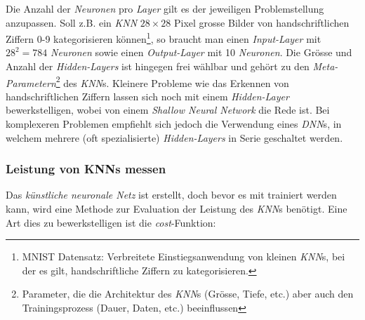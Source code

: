 
Die Anzahl der \textit{Neuronen} pro \textit{Layer} gilt es der jeweiligen Problemstellung anzupassen. Soll z.B. ein \textit{KNN} $28\times 28$ Pixel grosse Bilder von handschriftlichen Ziffern 0-9 kategorisieren können\footnote{MNIST Datensatz\cite{mnist}: Verbreitete Einstiegsanwendung von kleinen \textit{KNN}s, bei der es gilt, handschriftliche Ziffern zu kategorisieren.}, so braucht man einen \textit{Input-Layer} mit $28^2=784$ \textit{Neuronen} sowie einen \textit{Output-Layer} mit 10 \textit{Neuronen}. Die Grösse und Anzahl der \textit{Hidden-Layers} ist hingegen frei wählbar und gehört zu den \textit{Meta-Parametern}\footnote{Parameter, die die Architektur des \textit{KNN}s (Grösse, Tiefe, etc.) aber auch den Trainingsprozess (Dauer, Daten, etc.) beeinflussen} des \textit{KNN}s. Kleinere Probleme wie das Erkennen von handschriftlichen Ziffern lassen sich noch mit einem \textit{Hidden-Layer} bewerkstelligen, wobei von einem \textit{Shallow Neural Network} die Rede ist. Bei komplexeren Problemen empfiehlt sich jedoch die Verwendung eines \textit{DNN}s, in welchem mehrere (oft spezialisierte) \textit{Hidden-Layers} in Serie geschaltet werden.

\subsubsection{Leistung von KNNs messen}\label{cha:theo:cost}

Das \textit{künstliche neuronale Netz} ist erstellt, doch bevor es mit trainiert werden kann, wird eine Methode zur Evaluation der Leistung des \textit{KNN}s benötigt. Eine Art dies zu bewerkstelligen ist die \textit{cost}-Funktion:

